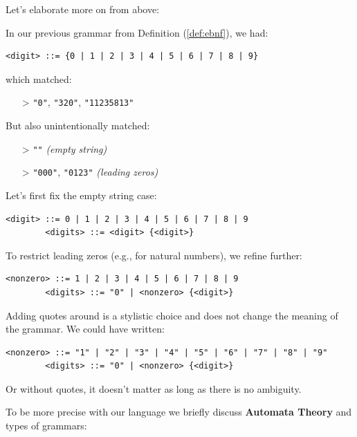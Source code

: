 Let's elaborate more on  from above:
\begin{Example}

    In our previous grammar from Definition (\ref{def:ebnf}), we had:
    \begin{lstlisting}[numbers=none]
        <digit> ::= {0 | 1 | 2 | 3 | 4 | 5 | 6 | 7 | 8 | 9}
    \end{lstlisting}
    which matched:
    \begin{itemize}
        \item[>] \texttt{"0"}, \texttt{"320"}, \texttt{"11235813"}
    \end{itemize}

    \noindent
    But also unintentionally matched:
    \begin{itemize}
        \item[>] \texttt{""} \hfill \textit{(empty string)}
        \item[>] \texttt{"000"}, \texttt{"0123"} \hfill \textit{(leading zeros)}
    \end{itemize}
    
    \noindent
    Let's first fix the empty string case:
    \begin{lstlisting}[numbers=none]
        <digit> ::= 0 | 1 | 2 | 3 | 4 | 5 | 6 | 7 | 8 | 9
        <digits> ::= <digit> {<digit>}
    \end{lstlisting}

    \noindent
    To restrict leading zeros (e.g., for natural numbers), we refine further:
    \begin{lstlisting}[numbers=none]
        <nonzero> ::= 1 | 2 | 3 | 4 | 5 | 6 | 7 | 8 | 9
        <digits> ::= "0" | <nonzero> {<digit>}
    \end{lstlisting}

    \noindent
    Adding quotes around  is a stylistic choice and does not change the meaning of the grammar. We could have written:
    \begin{lstlisting}[numbers=none]
        <nonzero> ::= "1" | "2" | "3" | "4" | "5" | "6" | "7" | "8" | "9"
        <digits> ::= "0" | <nonzero> {<digit>}
    \end{lstlisting}
    \noindent
    Or without quotes, it doesn't matter as long as there is no ambiguity.
\end{Example}

\noindent
To be more precise with our language we briefly discuss \textbf{Automata Theory} and types of grammars:

